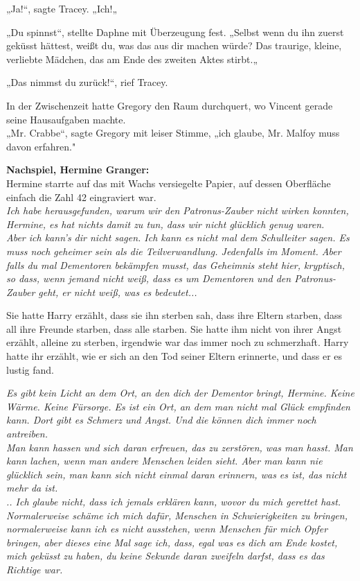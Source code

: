{„Ja!“, sagte Tracey. „Ich!„

„Du spinnst“, stellte Daphne mit Überzeugung fest. „Selbst wenn du ihn zuerst geküsst hättest, weißt du, was das aus dir machen würde? Das traurige, kleine, verliebte Mädchen, das am Ende des zweiten Aktes stirbt.„

„Das nimmst du zurück!“, rief Tracey.

In der Zwischenzeit hatte Gregory den Raum durchquert, wo Vincent gerade seine Hausaufgaben machte.\\ „Mr. Crabbe“, sagte Gregory mit leiser Stimme, „ich glaube, Mr. Malfoy muss davon erfahren."

\textbf{Nachspiel, Hermine Granger:}\\ Hermine starrte auf das mit Wachs versiegelte Papier, auf dessen Oberfläche einfach die Zahl 42 eingraviert war.\\

\hfill\break \emph{Ich habe herausgefunden, warum wir den Patronus-Zauber nicht wirken konnten, Hermine, es hat nichts damit zu tun, dass wir nicht glücklich genug waren.\\ Aber ich kann's dir nicht sagen. Ich kann es nicht mal dem Schulleiter sagen. Es muss noch geheimer sein als die Teilverwandlung. Jedenfalls im Moment. Aber falls du mal Dementoren bekämpfen musst, das Geheimnis steht hier, kryptisch, so dass, wenn jemand nicht weiß, dass es um Dementoren und den Patronus-Zauber geht, er nicht weiß, was es bedeutet...}

Sie hatte Harry erzählt, dass sie ihn sterben sah, dass ihre Eltern starben, dass all ihre Freunde starben, dass alle starben. Sie hatte ihm nicht von ihrer Angst erzählt, alleine zu sterben, irgendwie war das immer noch zu schmerzhaft. Harry hatte ihr erzählt, wie er sich an den Tod seiner Eltern erinnerte, und dass er es lustig fand.

\emph{Es gibt kein Licht an dem Ort, an den dich der Dementor bringt, Hermine. Keine Wärme. Keine Fürsorge. Es ist ein Ort, an dem man nicht mal Glück empfinden kann. Dort gibt es Schmerz und Angst. Und die können dich immer noch antreiben.\\ Man kann hassen und sich daran erfreuen, das zu zerstören, was man hasst. Man kann lachen, wenn man andere Menschen leiden sieht. Aber man kann nie glücklich sein, man kann sich nicht einmal daran erinnern, was es ist, das nicht mehr da ist.\\ .. Ich glaube nicht, dass ich jemals erklären kann, wovor du mich gerettet hast. Normalerweise schäme ich mich dafür, Menschen in Schwierigkeiten zu bringen, normalerweise kann ich es nicht ausstehen, wenn Menschen für mich Opfer bringen, aber dieses eine Mal sage ich, dass, egal was es dich am Ende kostet, mich geküsst zu haben, du keine Sekunde daran zweifeln darfst, dass es das Richtige war.}

}
